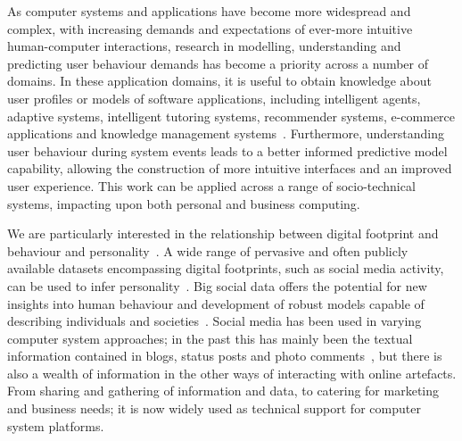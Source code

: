 \documentclass[graybox]{svmult}
\begin{document}
As computer systems and applications have become more widespread and
complex, with increasing demands and expectations of ever-more
intuitive human-computer interactions, research in modelling,
understanding and predicting user behaviour demands has become a
priority across a number of domains.  In these application domains, it
is useful to obtain knowledge about user profiles or models of
software applications, including intelligent agents, adaptive systems,
intelligent tutoring systems, recommender systems, e-commerce
applications and knowledge management
systems~\cite{schiaffino+amandi:2009}. Furthermore, understanding user
behaviour during system events leads to a better informed predictive
model capability, allowing the construction of more intuitive
interfaces and an improved user experience. This work can be applied
across a range of socio-technical systems, impacting upon both
personal and business computing.

We are particularly interested in the relationship between digital
footprint and behaviour and
personality~\citep{oatley+crick:2014,oatley-et-al_dasc2015,blamey-et-al-2012,blamey-et-al-2013}. A
wide range of pervasive and often publicly available datasets
encompassing digital footprints, such as social media activity, can be
used to infer
personality~\citep{lambiotte+kosinski:2014,oatley-et-al-soccogcomp2015}. Big
social data offers the potential for new insights into human behaviour
and development of robust models capable of describing individuals and
societies~\citep{lazer-et-al:2009}. Social media has been used in
varying computer system approaches; in the past this has mainly been
the textual information contained in blogs, status posts and photo
comments~\cite{blamey-et-al-2012,blamey-et-al-2013}, but there is also
a wealth of information in the other ways of interacting with online
artefacts. From sharing and gathering of information and data, to
catering for marketing and business needs; it is now widely used as
technical support for computer system platforms.
\end{document}
